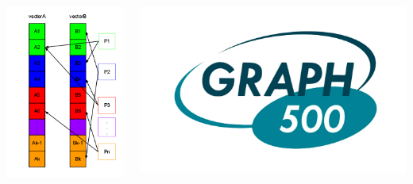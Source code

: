 \documentclass[final]{beamer}
\begin{document}
\begin{frame}[t]
\begin{columns}[t]
\begin{column}{0.60\paperwidth}
\begin{columns}[t,totalwidth=0.60\paperwidth]
\begin{column}{0.28\paperwidth}
\begin{columns}[t,totalwidth=0.28\paperwidth]
\begin{column}{0.12\paperwidth}
								\begin{center} \includegraphics[width=0.12\paperwidth]{img/rand_access} \end{center}
							\end{column}
							\begin{column}{0.12\paperwidth}
								\begin{center} \includegraphics[width=0.12\paperwidth]{img/logo_graph500} \end{center}

\end{column}
\end{columns}
\end{column}
\end{columns}
\end{column}
\end{columns}
\end{frame}
\end{document}
